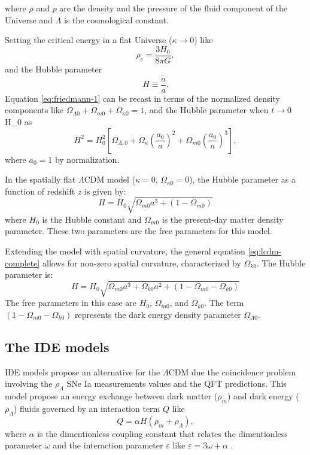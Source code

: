 \documentclass[final,3p,times]{elsarticle}
\begin{document}
where $\rho$ and $p$ are the density and the pressure of the fluid component of the Universe and $\Lambda$ is the cosmological constant.

Setting the critical energy in a flat Universe ($\kappa \to 0$) like
\begin{equation}
    \rho_c = \frac{3H_0}{8 \pi G},
\end{equation}
and the Hubble parameter
\begin{equation}
    H \equiv \frac{\dot{a}}{a}.
\end{equation}
Equation \eqref{eq:friedmann-1} can be recast in terms of the normalized density components like $\Omega_{\Lambda0}  + \Omega_{m0} + \Omega_{\kappa0} = 1$, and the Hubble parameter when $t\to 0$ H_0 as
\begin{equation}
    H^2 = H^2_0 \left[\Omega_{\Lambda,0} + \Omega_{\kappa}\left(\frac{a_0}{a}\right)^2 + \Omega_{m0}\left(\frac{a_0}{a}\right)^3 \right],
    \label{eq:lcdm-complete}
\end{equation}
where $a_0 =1 $ by normalization.

In the spatially flat $\Lambda$CDM model ($\kappa=0$, $\Omega_{\kappa0} = 0$), the Hubble parameter as a function of redshift $z$ is given by:
\begin{equation}
    H = H_0 \sqrt{\Omega_{m0}a^3 + (1-\Omega_{m0})}
    \label{eq:Hz_flat_lcdm_revised}
\end{equation}
where $H_0$ is the Hubble constant and $\Omega_{m0}$ is the present-day matter density parameter. These two parameters are the free parameters for this model.

Extending the model with spatial curvature, the general equation \eqref{eq:lcdm-complete} allows for non-zero spatial curvature, characterized by $\Omega_{k0}$. The Hubble parameter is:
\begin{equation}
    H = H_0 \sqrt{\Omega_{m0}a^3 + \Omega_{k0}a^2 + (1 - \Omega_{m0} - \Omega_{k0})}
    \label{eq:Hz_lcdm_curvature_revised}
\end{equation}
The free parameters in this case are $H_0$, $\Omega_{m0}$, and $\Omega_{k0}$. The term $(1 - \Omega_{m0} - \Omega_{k0})$ represents the dark energy density parameter $\Omega_{\Lambda 0}$.

\subsection{The IDE models}

IDE models propose an alternative for the $\Lambda\text{CDM}$ due the coincidence problem involving the $\rho_{\Lambda}$ SNe Ia measurements values and the QFT predictions.
This model propose an energy exchange between dark matter ($\rho_m$) and dark energy ($\rho_{\Lambda}$) fluids governed by an interaction term $Q$ like
\begin{equation}
    Q = \alpha H (\rho_m + \rho_{\Lambda}),
\end{equation}
where $\alpha$ is the dimentionless coupling constant that relates the dimentionless parameter $\omega$ and the interaction parameter $\varepsilon$ like $\varepsilon = 3 \omega + \alpha$ \cite{MAIA}.
\end{document}
